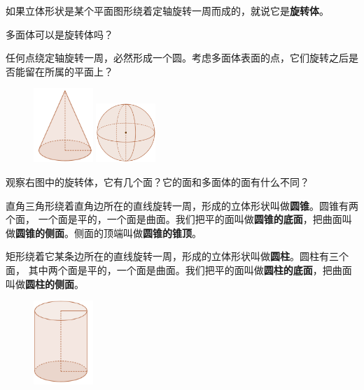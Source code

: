 \documentclass[12pt,UTF8]{ctexbook}
\begin{document}
如果立体形状是某个平面图形绕着定轴旋转一周而成的，就说它是\textbf{旋转体}。

多面体可以是旋转体吗？

任何点绕定轴旋转一周，必然形成一个圆。考虑多面体表面的点，它们旋转之后是否能留在所属的平面上？

\begin{figure} %
    \vspace{-10pt}
    \flushright
    \includegraphics[width=0.2\textwidth]{圆锥1.png}

    \vspace{20pt}
    \includegraphics[width=0.2\textwidth]{球体1.png}
\end{figure}

观察右图中的旋转体，它有几个面？它的面和多面体的面有什么不同？

直角三角形绕着直角边所在的直线旋转一周，形成的立体形状叫做\textbf{圆锥}。圆锥有两个面，
一个面是平的，一个面是曲面。我们把平的面叫做\textbf{圆锥的底面}，把曲面叫做\textbf{圆锥的侧面}。侧面的顶端叫做\textbf{圆锥的锥顶}。

矩形绕着它某条边所在的直线旋转一周，形成的立体形状叫做\textbf{圆柱}。圆柱有三个面，
其中两个面是平的，一个面是曲面。我们把平的面叫做\textbf{圆柱的底面}，把曲面叫做\textbf{圆柱的侧面}。

\begin{figure} %
    \vspace{-16pt}
    \flushleft
    \includegraphics[width=0.2\textwidth]{圆柱2.png}
\end{figure}
\end{document}
